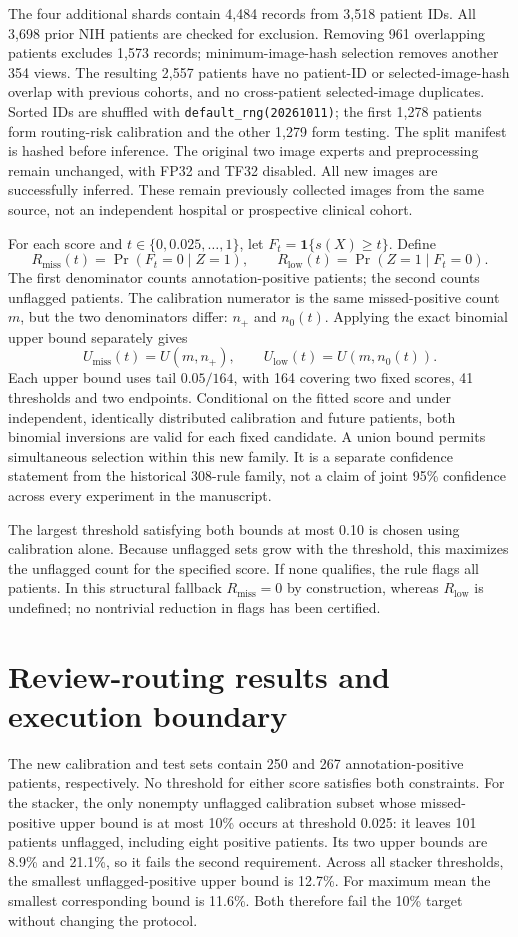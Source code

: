 \documentclass[10pt,a4paper]{article}
\begin{document}
The four additional shards contain 4,484 records from 3,518 patient IDs. All 3,698 prior NIH patients are checked for exclusion. Removing 961 overlapping patients excludes 1,573 records; minimum-image-hash selection removes another 354 views. The resulting 2,557 patients have no patient-ID or selected-image-hash overlap with previous cohorts, and no cross-patient selected-image duplicates. Sorted IDs are shuffled with \texttt{default\_rng(20261011)}; the first 1,278 patients form routing-risk calibration and the other 1,279 form testing. The split manifest is hashed before inference. The original two image experts and preprocessing remain unchanged, with FP32 and TF32 disabled. All new images are successfully inferred. These remain previously collected images from the same source, not an independent hospital or prospective clinical cohort.

For each score and $t\in\{0,0.025,\ldots,1\}$, let $F_t=\mathbf{1}\{s(X)\geq t\}$. Define
\[
 R_{\mathrm{miss}}(t)=\Pr(F_t=0\mid Z=1),\qquad
 R_{\mathrm{low}}(t)=\Pr(Z=1\mid F_t=0).
\]
The first denominator counts annotation-positive patients; the second counts unflagged patients. The calibration numerator is the same missed-positive count $m$, but the two denominators differ: $n_+$ and $n_0(t)$. Applying the exact binomial upper bound separately gives
\[
 U_{\mathrm{miss}}(t)=U(m,n_+),\qquad U_{\mathrm{low}}(t)=U(m,n_0(t)).
\]
Each upper bound uses tail $0.05/164$, with 164 covering two fixed scores, 41 thresholds and two endpoints. Conditional on the fitted score and under independent, identically distributed calibration and future patients, both binomial inversions are valid for each fixed candidate. A union bound permits simultaneous selection within this new family. It is a separate confidence statement from the historical 308-rule family, not a claim of joint 95\% confidence across every experiment in the manuscript.

The largest threshold satisfying both bounds at most 0.10 is chosen using calibration alone. Because unflagged sets grow with the threshold, this maximizes the unflagged count for the specified score. If none qualifies, the rule flags all patients. In this structural fallback $R_{\mathrm{miss}}=0$ by construction, whereas $R_{\mathrm{low}}$ is undefined; no nontrivial reduction in flags has been certified.

\clearpage
\section{Review-routing results and execution boundary}
The new calibration and test sets contain 250 and 267 annotation-positive patients, respectively. No threshold for either score satisfies both constraints. For the stacker, the only nonempty unflagged calibration subset whose missed-positive upper bound is at most 10\% occurs at threshold 0.025: it leaves 101 patients unflagged, including eight positive patients. Its two upper bounds are 8.9\% and 21.1\%, so it fails the second requirement. Across all stacker thresholds, the smallest unflagged-positive upper bound is 12.7\%. For maximum mean the smallest corresponding bound is 11.6\%. Both therefore fail the 10\% target without changing the protocol.
\end{document}
